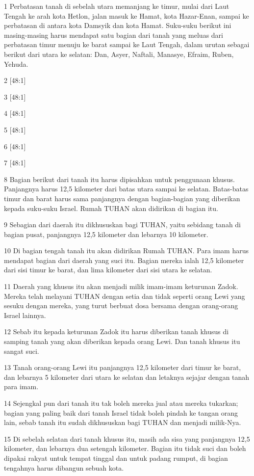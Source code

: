 \par 1 Perbatasan tanah di sebelah utara memanjang ke timur, mulai dari Laut Tengah ke arah kota Hetlon, jalan masuk ke Hamat, kota Hazar-Enan, sampai ke perbatasan di antara kota Damsyik dan kota Hamat. Suku-suku berikut ini masing-masing harus mendapat satu bagian dari tanah yang meluas dari perbatasan timur menuju ke barat sampai ke Laut Tengah, dalam urutan sebagai berikut dari utara ke selatan: Dan, Asyer, Naftali, Manasye, Efraim, Ruben, Yehuda.
\par 2 [48:1]
\par 3 [48:1]
\par 4 [48:1]
\par 5 [48:1]
\par 6 [48:1]
\par 7 [48:1]
\par 8 Bagian berikut dari tanah itu harus dipisahkan untuk penggunaan khusus. Panjangnya harus 12,5 kilometer dari batas utara sampai ke selatan. Batas-batas timur dan barat harus sama panjangnya dengan bagian-bagian yang diberikan kepada suku-suku Israel. Rumah TUHAN akan didirikan di bagian itu.
\par 9 Sebagian dari daerah itu dikhususkan bagi TUHAN, yaitu sebidang tanah di bagian pusat, panjangnya 12,5 kilometer dan lebarnya 10 kilometer.
\par 10 Di bagian tengah tanah itu akan didirikan Rumah TUHAN. Para imam harus mendapat bagian dari daerah yang suci itu. Bagian mereka ialah 12,5 kilometer dari sisi timur ke barat, dan lima kilometer dari sisi utara ke selatan.
\par 11 Daerah yang khusus itu akan menjadi milik imam-imam keturunan Zadok. Mereka telah melayani TUHAN dengan setia dan tidak seperti orang Lewi yang sesuku dengan mereka, yang turut berbuat dosa bersama dengan orang-orang Israel lainnya.
\par 12 Sebab itu kepada keturunan Zadok itu harus diberikan tanah khusus di samping tanah yang akan diberikan kepada orang Lewi. Dan tanah khusus itu sangat suci.
\par 13 Tanah orang-orang Lewi itu panjangnya 12,5 kilometer dari timur ke barat, dan lebarnya 5 kilometer dari utara ke selatan dan letaknya sejajar dengan tanah para imam.
\par 14 Sejengkal pun dari tanah itu tak boleh mereka jual atau mereka tukarkan; bagian yang paling baik dari tanah Israel tidak boleh pindah ke tangan orang lain, sebab tanah itu sudah dikhususkan bagi TUHAN dan menjadi milik-Nya.
\par 15 Di sebelah selatan dari tanah khusus itu, masih ada sisa yang panjangnya 12,5 kilometer, dan lebarnya dua setengah kilometer. Bagian itu tidak suci dan boleh dipakai rakyat untuk tempat tinggal dan untuk padang rumput, di bagian tengahnya harus dibangun sebuah kota.
